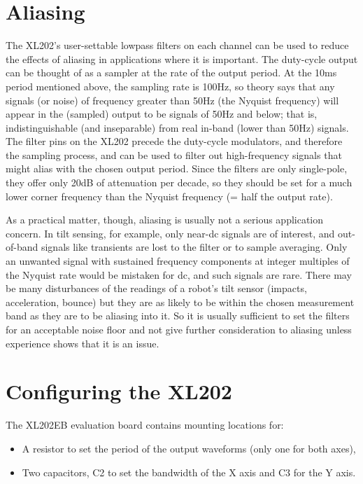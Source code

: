 \section{Aliasing}

The XL202's user-settable lowpass filters on each channel can be used
to reduce the effects of aliasing in applications where it is
important.  The duty-cycle output can be thought of as a sampler at
the rate of the output period.  At the 10ms period mentioned above,
the sampling rate is 100Hz, so theory says that any signals (or noise)
of frequency greater than 50Hz (the Nyquist frequency) will appear in
the (sampled) output to be signals of 50Hz and below; that is,
indistinguishable (and inseparable) from real in-band (lower than 50Hz) signals.
The filter pins on the XL202 precede the duty-cycle modulators, and
therefore the sampling process, and can be used to filter out
high-frequency signals that might alias with the chosen output period.
Since the filters are only single-pole, they offer only 20dB of
attenuation per decade, so they should be set for a much lower corner
frequency than the Nyquist frequency (= half the output rate).

As a practical matter, though, aliasing is usually not a serious
application concern.   In tilt sensing, for example, only near-dc
signals are of interest, and out-of-band signals like transients are
lost to the filter or to sample averaging.  Only an unwanted signal
with sustained frequency components at integer multiples of the
Nyquist rate would be mistaken for dc, and such signals are rare.
There may be many disturbances of the readings of a robot's tilt
sensor (impacts, acceleration, bounce) but they are as likely to be
within the chosen measurement band as they are to be aliasing into it.
So it is usually sufficient to set the filters for an acceptable noise
floor and not give further consideration to aliasing unless experience
shows that it is an issue.

\section{Configuring the XL202}

The XL202EB evaluation board contains mounting locations for:
\begin{itemize}
\item
 A resistor to set the period of the output waveforms (only one
   for both axes),
\item
 Two capacitors, C2 to set the bandwidth of the X axis and C3 for
   the Y axis.
\end{itemize}

